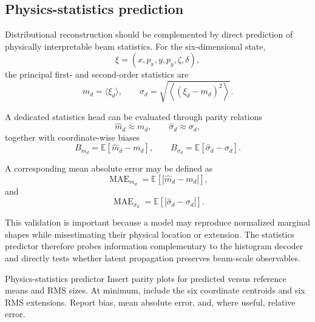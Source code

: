 \subsection{Physics-statistics prediction}
\label{subsec:results_physics_statistics}

Distributional reconstruction should be complemented by direct prediction of physically interpretable beam statistics. For the six-dimensional state,
\begin{equation}
\xi
=
(x,p_x,y,p_y,\zeta,\delta),
\end{equation}
the principal first- and second-order statistics are
\begin{equation}
m_d
=
\langle\xi_d\rangle,
\qquad
\sigma_d
=
\sqrt{
\left\langle
(\xi_d-m_d)^2
\right\rangle
}.
\label{eq:physics_statistics_definition}
\end{equation}

A dedicated statistics head can be evaluated through parity relations
\begin{equation}
\widehat{m}_d
\approx
m_d,
\qquad
\widehat{\sigma}_d
\approx
\sigma_d,
\label{eq:physics_statistics_parity}
\end{equation}
together with coordinate-wise biases
\begin{equation}
B_{m_d}
=
\mathbb{E}
\left[
\widehat{m}_d-m_d
\right],
\qquad
B_{\sigma_d}
=
\mathbb{E}
\left[
\widehat{\sigma}_d-\sigma_d
\right].
\label{eq:physics_statistics_bias}
\end{equation}

A corresponding mean absolute error may be defined as
\begin{equation}
\operatorname{MAE}_{m_d}
=
\mathbb{E}
\left[
\left|
\widehat{m}_d-m_d
\right|
\right],
\end{equation}
and
\begin{equation}
\operatorname{MAE}_{\sigma_d}
=
\mathbb{E}
\left[
\left|
\widehat{\sigma}_d-\sigma_d
\right|
\right].
\end{equation}

This validation is important because a model may reproduce normalized marginal shapes while misestimating their physical location or extension. The statistics predictor therefore probes information complementary to the histogram decoder and directly tests whether latent propagation preserves beam-scale observables.

\placeholderfigure
{Physics-statistics predictor}
{Insert parity plots for predicted versus reference means and RMS sizes. At minimum, include the six coordinate centroids and six RMS extensions. Report bias, mean absolute error, and, where useful, relative error.}

